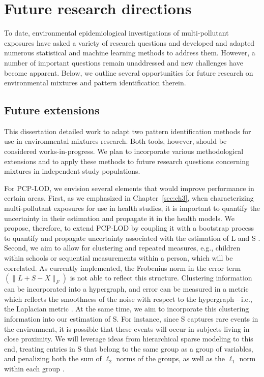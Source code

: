 \section{Future research directions}\label{sec:future}
To date, environmental epidemiological investigations of multi-pollutant exposures have asked a variety of research questions and developed and adapted numerous statistical and machine learning methods to address them. However, a number of important questions remain unaddressed and new challenges have become apparent. Below, we outline several opportunities for future research on environmental mixtures and pattern identification therein.

\subsection{Future extensions}\label{diss:future}
This dissertation detailed work to adapt two pattern identification methods for use in environmental mixtures research. Both tools, however, should be considered works-in-progress. We plan to incorporate various methodological extensions and to apply these methods to future research questions concerning mixtures in independent study populations.

For PCP-LOD, we envision several elements that would improve performance in certain areas. First, as we emphasized in Chapter~\ref{sec:ch3}, when characterizing multi-pollutant exposures for use in health studies, it is important to quantify the uncertainty in their estimation and propagate it in the health models. We propose, therefore, to extend PCP-LOD by coupling it with a bootstrap process to quantify and propagate uncertainty associated with the estimation of L and S \citep{mak14_unc}. Second, we aim to allow for clustering and repeated measures, e.g., children within schools or sequential measurements within a person, which will be correlated. As currently implemented, the Frobenius norm in the error term $\left( \|L+S-X\|_{F} \right)$ is not able to reflect this structure. Clustering information can be incorporated into a hypergraph, and error can be measured in a metric which reflects the smoothness of the noise with respect to the hypergraph---i.e., the Laplacian metric \citep{zhou2006learning, kaminski2019clustering}. At the same time, we aim to incorporate this clustering information into our estimation of S. For instance, since S captures rare events in the environment, it is possible that these events will occur in subjects living in close proximity. We will leverage ideas from hierarchical sparse modeling to this end, treating entries in S that belong to the same group as a group of variables, and penalizing both the sum of $\ell_2$ norms of the groups, as well as the $\ell_1$ norm within each group \citep{yan2017hierarchical, sprechmann2011c, jenatton2011proximal}.

